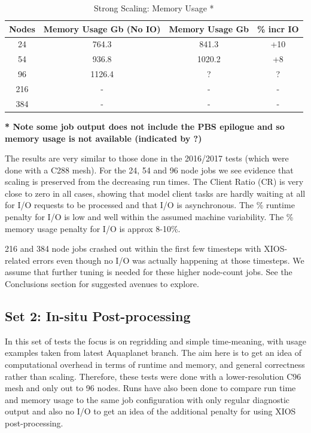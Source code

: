 \begin{table}[ht!]
\scriptsize
  \begin{center}
    \caption{Strong Scaling: Memory Usage *}
    \label{tab:table2}
     \begin{tabular}{|c|c|c|c|}
      \textbf{Nodes} & \textbf{Memory Usage Gb (No IO)} & \textbf{Memory Usage Gb} & \textbf{\% incr IO} \\
      \hline
      24 & 764.3 & 841.3 & +10 \\
      54 & 936.8 & 1020.2 & +8 \\
      96 & 1126.4 & ? & ? \\
      216 & - & - & -  \\
      384 & -  & -  & -  \\
    \end{tabular}
  \end{center}
\end{table}

\scriptsize \textbf{* Note some job output does not include the PBS epilogue and so memory usage is not available (indicated by ?)}
\newline

\normalsize
The results are very similar to those done in the 2016/2017 tests (which were done with a C288 mesh). For the 24, 54 and 96 node jobs we see
evidence that scaling is preserved from the decreasing run times. The Client Ratio (CR) is very close to zero in all cases, 
showing that model client tasks are hardly waiting at all for I/O requests to be processed and that I/O is asynchronous.
The \% runtime penalty for I/O is low and well within the assumed machine variability. The \% memory usage penalty for I/O is approx 8-10\%. 

216 and 384 node jobs crashed out within the first few timesteps with XIOS-related errors even though no I/O was
actually happening at those timesteps. We assume that further tuning is needed for these higher node-count jobs.
See the Conclusions section for suggested avenues to explore.

\subsection{Set 2: In-situ Post-processing}

In this set of tests the focus is on regridding and simple time-meaning, with usage examples taken from latest Aquaplanet branch.
The aim here is to get an idea of computational overhead in terms of runtime and memory, and general correctness rather than scaling.
Therefore, these tests were done with a lower-resolution C96 mesh and only out to 96 nodes.
Runs have also been done to compare run time and memory usage to the same job configuration with only regular diagnostic output and also 
no I/O to get an idea of the additional penalty for using XIOS post-processing. 


